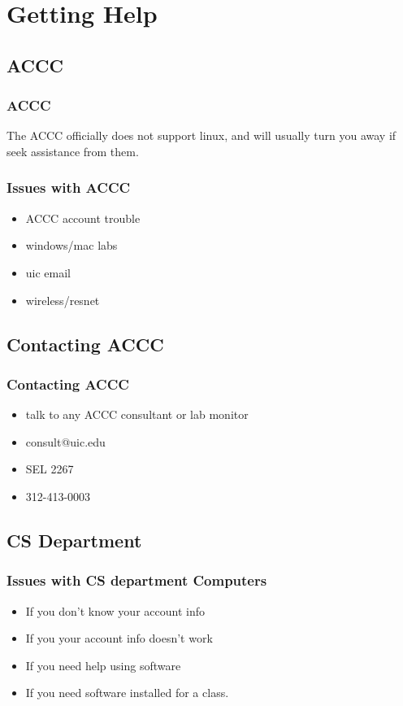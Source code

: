 \documentclass[hyperref={pdfpagelabels=false}]{beamer}
\begin{document}
\section{Getting Help}

\subsection{ACCC}
\frame
{
	\frametitle{ACCC}
	The ACCC officially does not support linux, and will usually turn you away if
	seek assistance from them.
}
\frame
{
    \frametitle{Issues with ACCC}
    \begin{itemize}
    \item{ACCC account trouble}
    \item{windows/mac labs}
    \item{uic email}
    \item{wireless/resnet}
    \end{itemize}
}
\subsection{Contacting ACCC}
\frame
{
    \frametitle{Contacting ACCC}
    \begin{itemize}
    \item{talk to any ACCC consultant or lab monitor}
    \item{consult@uic.edu}
    \item{SEL 2267}
    \item{312-413-0003}
    \end{itemize}
}
\subsection{CS Department}
\frame
{
    \frametitle{Issues with CS department Computers}
    \begin{itemize}
    \item{If you don't know your account info}
    \item{If you your account info doesn't work}
    \item{If you need help using software}
    \item{If you need software installed for a class.}
    \end{itemize}
}
\end{document}
